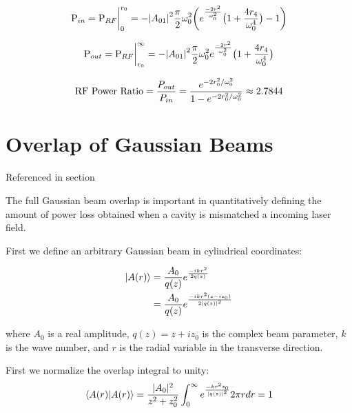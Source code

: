 \documentclass[oneside]{book}
\begin{document}
\begin{appendices}
	\begin{equation}
	\text{P}_{in} \\
	= \text{P}_{RF} \biggr\rvert_0^{r_0} \\
	= - \abs{A_{01}}^2  \frac{\pi}{2} \omega_{0}^2 \bigg( e^{\frac{-2r^2}{\omega_{0}^2}} \big(1 + \frac{4 r_4}{\omega_{0}^4} \big) - 1 \bigg)
	\end{equation}
	
	\begin{equation}
	\text{P}_{out} \\
	= \text{P}_{RF} \biggr\rvert_{r_0}^{\infty}\\ 
	= - \abs{A_{01}}^2  \frac{\pi}{2} \omega_{0}^2 e^{\frac{-2r^2}{\omega_{0}^2}} \big(1 + \frac{4 r_4}{\omega_{0}^4} \big) 
	\end{equation}
	
	\begin{equation}
	\text{RF Power Ratio} 
	= \frac{P_{out}}{P_{in}} \\
	= \frac{e^{-2r_0^2/ \omega_{0}^2}} {1 - e^{-2r_0^2/ \omega_{0}^2 }} \approx 2.7844
	\end{equation}
	
	\chapter{Overlap of Gaussian Beams}
	
	Referenced in section
	
	The full Gaussian beam overlap is important in quantitatively defining the amount of power loss obtained when a cavity is mismatched a incoming laser field.
	
	First we define an arbitrary Gaussian beam in cylindrical coordinates:
	
	\begin{equation}
	\begin{split}
	\ket{A(r)} 
	&= \frac{A_0}{q(z)} e^{\frac{-ikr^2}{2q(z)}}\\
	&= \frac{A_0}{q(z)} e^{\frac{-ikr^2(z-iz_0)}{2\abs{q(z)}^2}}
	\end{split}
	\end{equation}
	
	where $A_0$ is a real amplitude, $q(z)= z + i z_0$ is the complex beam parameter, $k$ is the wave number, and $r$ is the radial variable in the transverse direction.

	First we normalize the overlap integral to unity:
	\begin{equation}
	\braket{A(r)|A(r)} 
	=  \frac{\rvert A_0 \rvert^2}{z^2+z_0^2} \int_{0}^{\infty} e^{\frac{-kr^2 z_0}{\abs{q(z)}^2}} 2 \pi r dr = 1
	\end{equation}


\end{appendices}
\end{document}
